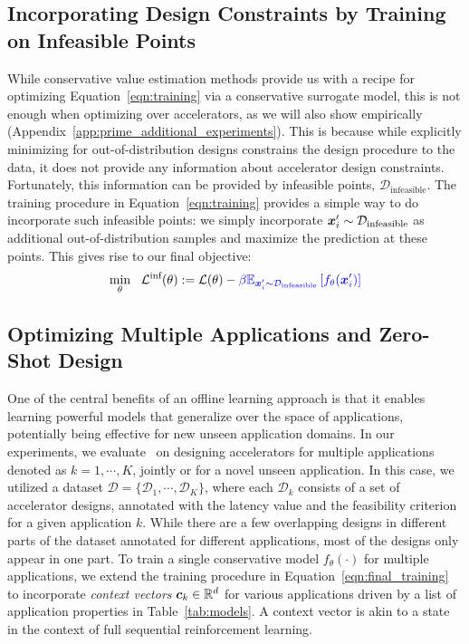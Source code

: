 \vspace{-0.2cm}
\subsection{Incorporating Design Constraints by Training on Infeasible Points}
\vspace{-0.2cm}
While conservative value estimation methods provide us with a recipe for optimizing Equation~\ref{eqn:training} via a conservative surrogate model, this is not enough when optimizing over accelerators, as we will also show empirically (Appendix~\ref{app:prime_additional_experiments}).
This is because while explicitly minimizing for out-of-distribution designs constrains the design procedure to the data, it does not provide any information about accelerator design constraints. Fortunately, this information can be provided by infeasible points, $\mathcal{D}_\text{infeasible}$. The training procedure in Equation~\ref{eqn:training} provides a simple way to do incorporate such infeasible points: we simply incorporate ${\boldsymbol{x}}'_i \sim \mathcal{D}_{\text{infeasible}}$ as additional out-of-distribution samples and maximize the prediction at these points. This gives rise to our final objective:
\begin{align}
\label{eqn:final_training}
    \min_\theta~~ \mathcal{L}^\text{inf}(\theta) := \mathcal{L}(\theta)
    - \textcolor{blue}{\beta \mathbb{E}_{{\boldsymbol{x}}'_i \sim \mathcal{D}_{\text{infeasible}}}\left[ f_\theta({\boldsymbol{x}}'_i) \right]}
\end{align}

\vspace{-0.2cm}
\subsection{Optimizing Multiple Applications and Zero-Shot Design}
\vspace{-0.2cm}
%
One of the central benefits of an offline learning approach is that it enables learning powerful models that generalize over the space of applications, potentially being effective for new unseen application domains. In our experiments, we evaluate \primemethodname\ on designing accelerators for multiple applications denoted as $k=1, \cdots, K$, jointly or for a novel unseen application. In this case, we utilized a dataset $\mathcal{D} = \{\mathcal{D}_1, \cdots, \mathcal{D}_K\}$, where each $\mathcal{D}_k$ consists of a set of accelerator designs, annotated with the latency value and the feasibility criterion for a given application $k$. While there are a few overlapping designs in different parts of the dataset annotated for different applications, most of the designs only appear in one part. To train a single conservative model $f_\theta(\cdot)$ for multiple applications, we extend the training procedure in Equation~\ref{eqn:final_training} to incorporate \textit{context vectors} ${\boldsymbol{c}}_k \in \mathbb{R}^d$ for various applications driven by a list of application properties in Table~\ref{tab:models}. A context vector is akin to a state in the context of full sequential reinforcement learning. 

